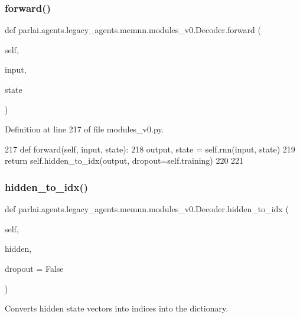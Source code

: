 \subsubsection{\texorpdfstring{forward()}{forward()}}
{\footnotesize\ttfamily def parlai.\+agents.\+legacy\+\_\+agents.\+memnn.\+modules\+\_\+v0.\+Decoder.\+forward (\begin{DoxyParamCaption}\item[{}]{self,  }\item[{}]{input,  }\item[{}]{state }\end{DoxyParamCaption})}



Definition at line 217 of file modules\+\_\+v0.\+py.


\begin{DoxyCode}
217     \textcolor{keyword}{def }forward(self, input, state):
218         output, state = self.rnn(input, state)
219         \textcolor{keywordflow}{return} self.hidden\_to\_idx(output, dropout=self.training)
220 
221 
\end{DoxyCode}
\mbox{\label{classparlai_1_1agents_1_1legacy__agents_1_1memnn_1_1modules__v0_1_1Decoder_aafa684988d164a4ec2cfdb141e1ea31e}} 
\subsubsection{\texorpdfstring{hidden\+\_\+to\+\_\+idx()}{hidden\_to\_idx()}}
{\footnotesize\ttfamily def parlai.\+agents.\+legacy\+\_\+agents.\+memnn.\+modules\+\_\+v0.\+Decoder.\+hidden\+\_\+to\+\_\+idx (\begin{DoxyParamCaption}\item[{}]{self,  }\item[{}]{hidden,  }\item[{}]{dropout = {\ttfamily False} }\end{DoxyParamCaption})}

\begin{DoxyVerb}Converts hidden state vectors into indices into the dictionary.
\end{DoxyVerb}
 

